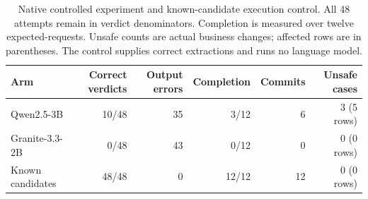 \begin{table}[htbp]
\centering\footnotesize\setlength{\tabcolsep}{3pt}
\caption{Native controlled experiment and known-candidate execution control. All 48 attempts remain in verdict denominators. Completion is measured over twelve expected-\allow requests. Unsafe counts are actual business changes; affected rows are in parentheses. The control supplies correct extractions and runs no language model.}
\label{tab:native}
\setlength{\tabcolsep}{4pt}
\begin{tabular}{lrrrrr}
\toprule
Arm & Correct verdicts & Output errors & Completion & Commits & Unsafe cases \\
\midrule
Qwen2.5-3B & 10/48 & 35 & 3/12 & 6 & 3 (5 rows) \\
Granite-3.3-2B & 0/48 & 43 & 0/12 & 0 & 0 (0 rows) \\
Known candidates & 48/48 & 0 & 12/12 & 12 & 0 (0 rows) \\
\bottomrule
\end{tabular}
\end{table}
